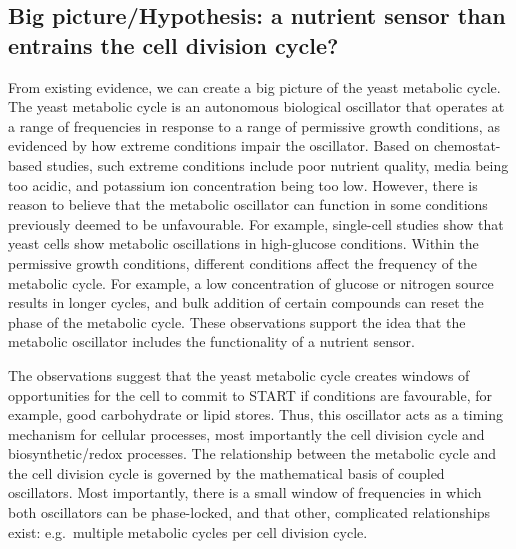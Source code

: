 \subsection[Big picture/Hypothesis]{Big picture/Hypothesis: a nutrient sensor than entrains the cell division cycle?}
\label{subsec:intro-ymc-hypothesis}

From existing evidence, we can create a big picture of the yeast metabolic cycle.
The yeast metabolic cycle is an autonomous biological oscillator that operates at a range of frequencies in response to a range of permissive growth conditions, as evidenced by how extreme conditions impair the oscillator.
Based on chemostat-based studies, such extreme conditions include poor nutrient quality, media being too acidic, and potassium ion concentration being too low.
However, there is reason to believe that the metabolic oscillator can function in some conditions previously deemed to be unfavourable.
For example, single-cell studies show that yeast cells show metabolic oscillations in high-glucose conditions.
Within the permissive growth conditions, different conditions affect the frequency of the metabolic cycle.
For example, a low concentration of glucose or nitrogen source results in longer cycles, and bulk addition of certain compounds can reset the phase of the metabolic cycle.
These observations support the idea that the metabolic oscillator includes the functionality of a nutrient sensor.

The observations suggest that the yeast metabolic cycle creates windows of opportunities for the cell to commit to START if conditions are favourable, for example, good carbohydrate or lipid stores.
Thus, this oscillator acts as a timing mechanism for cellular processes, most importantly the cell division cycle and biosynthetic/redox processes.
The relationship between the metabolic cycle and the cell division cycle is governed by the mathematical basis of coupled oscillators.
Most importantly, there is a small window of frequencies in which both oscillators can be phase-locked, and that other, complicated relationships exist: e.g.\ multiple metabolic cycles per cell division cycle.


